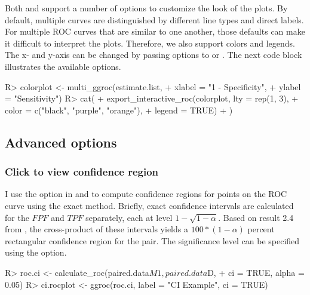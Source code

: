 \documentclass[codesnippet]{jss}
\begin{document}
Both  and  support a
number of options to customize the look of the plots. By default,
multiple curves are distinguished by different line types and direct
labels. For multiple ROC curves that are similar to one another, those
defaults can make it difficult to interpret the plots. Therefore, we
also support colors and legends. The x- and y-axis can be changed by
passing options to  or . The next code
block illustrates the available options.

\begin{Schunk}
\begin{Sinput}
R> colorplot <- multi_ggroc(estimate.list, 
+                          xlabel = "1 - Specificity", 
+                          ylabel = "Sensitivity")
R> cat(
+   export_interactive_roc(colorplot, lty = rep(1, 3), 
+                          color = c("black", "purple", "orange"), 
+                          legend = TRUE)
+   )
\end{Sinput}
\end{Schunk}

\subsection{Advanced options}\label{advanced-options}

\subsubsection{Click to view confidence
region}\label{click-to-view-confidence-region}

I use the  option in  and
 to compute confidence regions for points on the ROC curve
using the \citet{clopper1934use} exact method. Briefly, exact confidence
intervals are calculated for the \(FPF\) and \(TPF\) separately, each at
level \(1 - \sqrt{1 - \alpha}\). Based on result 2.4 from
\citet{pepe2003statistical}, the cross-product of these intervals yields
a \(100 * (1 - \alpha)\) percent rectangular confidence region for the
pair. The significance level can be specified using the 
option.

\begin{Schunk}
\begin{Sinput}
R> roc.ci <- calculate_roc(paired.data$M1, paired.data$D, 
+                         ci = TRUE, alpha = 0.05)
R> ci.rocplot <- ggroc(roc.ci, label = "CI Example", ci = TRUE)
\end{Sinput}
\end{Schunk}
\end{document}
